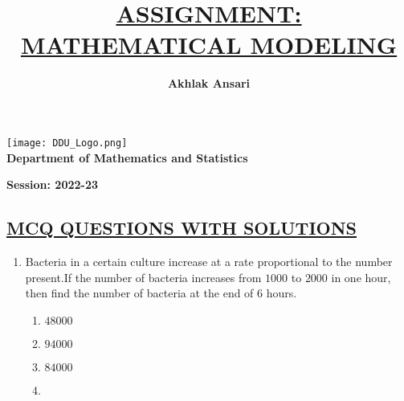 \documentclass[12pt,a4paper]{article}
\title{{\bf \underline{ASSIGNMENT: MATHEMATICAL MODELING}}}
\author{\bf Akhlak Ansari}
\begin{document}
    \maketitle

    \pagestyle{fancy}
    \fancyfoot{}
    \color{black}
    \rfoot{\thepage}
    \renewcommand{\footrulewidth}{1pt}

    \begin{center}
      
        \texttt{[image: DDU\_Logo.png]}\\[3mm]
        \textbf{ {\LARGE Department of Mathematics and Statistics}}
       
        \vspace{7.8cm}

        \textbf{Session: 2022-23}

    \end{center}

    \vspace*{0.5cm}

    \begin{center}
        \section*{\underline{{\bf MCQ QUESTIONS WITH SOLUTIONS}}}
    \end{center}

    \begin{enumerate}
        \item Bacteria in a certain culture increase at a rate proportional to the number present.If the number of bacteria increases from $1000$ to $2000$ in one hour, then find the number of bacteria at the end of $6$ hours. 
        \begin{enumerate}
            \item $48000$
            \item $94000$
            \item $84000$
            \item \color{blue}{$64000$}
        \end{enumerate}
    \end{enumerate}
\end{document}
